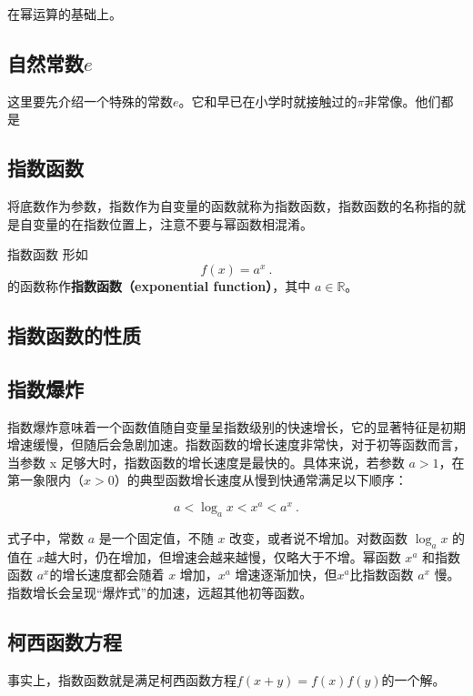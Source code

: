 
\begin{issues}
\issueDraft
\end{issues}


在幂运算的基础上。

\subsection{自然常数$e$}

这里要先介绍一个特殊的常数$e$。它和早已在小学时就接触过的$\pi$非常像。他们都是


\subsection{指数函数}

将底数作为参数，指数作为自变量的函数就称为指数函数，指数函数的名称指的就是自变量的在指数位置上，注意不要与幂函数相混淆。

\begin{definition}{指数函数}
形如
\begin{equation}
f(x) = a^x~.
\end{equation}
的函数称作\textbf{指数函数（exponential function）}，其中 $a\in\mathbb R$。
\end{definition}
\subsection{指数函数的性质}

\subsection{指数爆炸}

指数爆炸意味着一个函数值随自变量呈指数级别的快速增长，它的显著特征是初期增速缓慢，但随后会急剧加速。指数函数的增长速度非常快，对于初等函数而言，当参数 x 足够大时，指数函数的增长速度是最快的。具体来说，若参数 $a > 1$，在第一象限内（$x > 0$）的典型函数增长速度从慢到快通常满足以下顺序：

\begin{equation}
 a < \log_a{x} <x^a < a^x~.
\end{equation}

式子中，常数 $a$ 是一个固定值，不随 $x$ 改变，或者说不增加。对数函数 $\log_a{x}$ 的值在 $x$越大时，仍在增加，但增速会越来越慢，仅略大于不增。幂函数 $x^a$ 和指数函数 $a^x$的增长速度都会随着 $x$ 增加，$x^a$ 增速逐渐加快，但$x^a$比指数函数 $a^x$ 慢。指数增长会呈现“爆炸式”的加速，远超其他初等函数。

\subsection{柯西函数方程}

事实上，指数函数就是满足柯西函数方程$f(x+y)=f(x)f(y)$的一个解。
